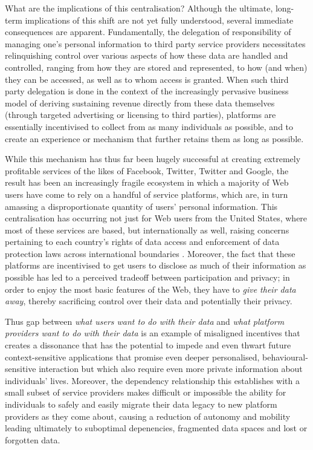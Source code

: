 \documentclass[runningheads,a4paper]{llncs}
\begin{document}
What are the implications of this centralisation?  Although the ultimate, long-term implications of this shift are not yet fully understood, several immediate consequences are apparent. Fundamentally, the delegation of responsibility of managing one's personal information to third party service providers necessitates relinquishing control over various aspects of how these data are handled and controlled, ranging from how they are stored and represented, to how (and when) they can be accessed, as well as to whom access is granted.  When such third party delegation is done in the context of the increasingly pervasive business model of deriving sustaining revenue directly from these data themselves (through targeted advertising or licensing to third parties), platforms are essentially incentivised to collect from as many individuals as possible, and to create an experience or mechanism that further retains them as long as possible.

While this mechanism has thus far been hugely successful at creating extremely profitable services of the likes of Facebook, Twitter, Twitter and Google, the result has been an increasingly fragile ecosystem in which a majority of Web users have come to rely on a handful of service platforms, which are, in turn amassing a disproportionate quantity of users' personal information.  This centralisation has occurring not just for Web users from the United States, where most of these services are based, but internationally as well, raising concerns pertaining to each country's rights of data access and enforcement of data protection laws across international boundaries \cite{internationalownership}. Moreover, the fact that these platforms are incentivised to get users to disclose as much of their information as possible has led to a perceived tradeoff between participation and privacy; in order to enjoy the most basic features of the Web, they have to \emph{give their data away}, thereby sacrificing control over their data and potentially their privacy.

Thus gap between \emph{what users want to do with their data} and \emph{what platform providers want to do with their data} is an example of misaligned incentives that creates a dissonance that has the potential to impede and even thwart future context-sensitive applications that promise even deeper personalised, behavioural-sensitive interaction but which also require even more private information about individuals' lives.  Moreover, the dependency relationship this establishes with a small subset of service providers makes difficult or impossible the ability for individuals to safely and easily migrate their data legacy to new platform providers as they come about, causing a reduction of autonomy and mobility leading ultimately to suboptimal depenencies, fragmented data spaces and lost or forgotten data\cite{lostlegacy}.
\end{document}
